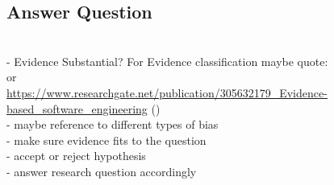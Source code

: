 
\subsection{Answer Question}
\label{subsec:answer question}

\\
- Evidence Substantial? For Evidence classification maybe quote:\\
\cite{Wohlin2013EvidenceProfile} or \\
\url{https://www.researchgate.net/publication/305632179_Evidence-based_software_engineering} () \\
- maybe reference to different types of bias\\
- make sure evidence fits to the question\\
- accept or reject hypothesis\\
- answer research question accordingly\\
